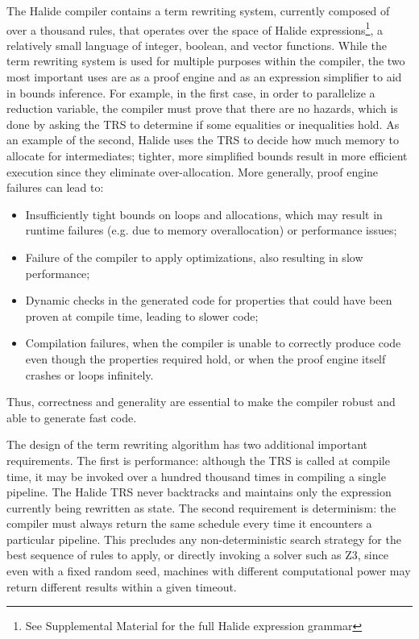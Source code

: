 \documentclass[acmsmall,review,anonymous]{acmart}\settopmatter{printfolios=true,printccs=false,printacmref=false}
\begin{document}
The Halide compiler contains a term rewriting system, currently composed of
over a thousand rules, that operates over the space of Halide
expressions\footnote{See Supplemental Material for the full Halide
  expression grammar}, a relatively small language of integer, boolean, and vector functions. While the term rewriting system is used for multiple
purposes within the compiler, the two most important
uses are as a proof engine and as an expression simplifier to aid in bounds inference. For example, in the first case, in order to parallelize a
reduction variable, the compiler must prove that there are no hazards, which is
done by asking the TRS to determine if some equalities or inequalities hold.  As an example of the second, Halide uses
the TRS to decide how much memory to allocate for intermediates; tighter, more
simplified bounds result in more efficient execution since they eliminate over-allocation.
More generally, proof engine failures can lead to:
\begin{itemize}
\item Insufficiently tight bounds on loops and allocations, which may result in
  runtime failures (e.g. due to memory overallocation) or performance issues;

\item Failure of the compiler to apply optimizations, also resulting in slow performance;

\item Dynamic checks in the generated code for properties that could have been proven
  at compile time, leading to slower code;

\item Compilation failures, when the compiler is unable to correctly produce code
  even though the properties required hold, or when the proof engine itself crashes
  or loops infinitely.
\end{itemize}
Thus, correctness and generality are essential to make the compiler robust and
able to generate fast code.

The design of the term rewriting algorithm has two additional important
requirements. The first is performance: although the TRS is called at
compile time, it may be invoked over a hundred thousand times in compiling a single pipeline. 
The Halide TRS
never backtracks and maintains only the expression currently being rewritten as state. The second requirement is determinism: the compiler must
always return the same schedule every time it encounters a particular pipeline.
This precludes any non-deterministic search strategy for the best sequence of
rules to apply, or directly invoking a solver such as Z3, since even with a
fixed random seed, machines with different computational power may return
different results within a given timeout.
\end{document}
